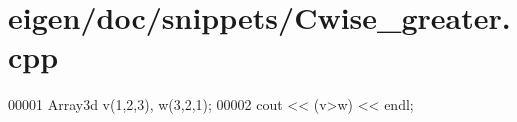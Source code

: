 \hypertarget{eigen_2doc_2snippets_2_cwise__greater_8cpp_source}{}\section{eigen/doc/snippets/\+Cwise\+\_\+greater.cpp}
\label{eigen_2doc_2snippets_2_cwise__greater_8cpp_source}

\begin{DoxyCode}
00001 Array3d v(1,2,3), w(3,2,1);
00002 cout << (v>w) << endl;
\end{DoxyCode}
